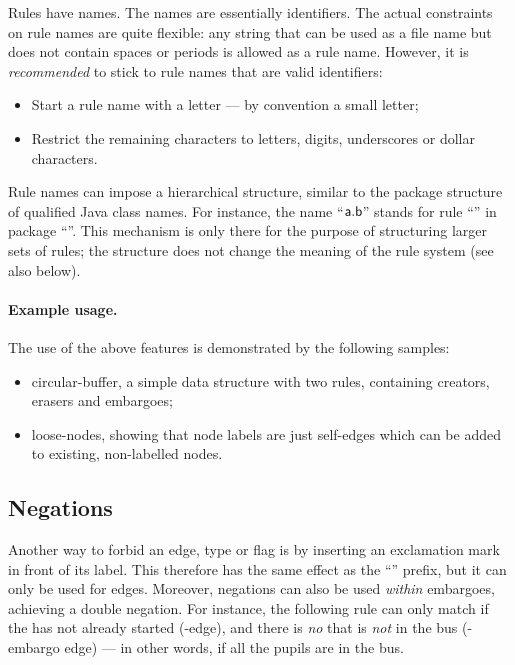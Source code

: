 Rules have names. The names are essentially identifiers. The actual constraints
on rule names are quite flexible: any string that can be used as a file name
but does not contain spaces or periods is allowed as a rule name. However, it
is \emph{recommended} to stick to rule names that are valid identifiers:
%
\begin{itemize}\noitemsep
\item Start a rule name with a letter --- by convention a small letter;
\item Restrict the remaining characters to letters, digits, underscores or
  dollar characters.
\end{itemize}
%
Rule names can impose a hierarchical structure, similar to the package
structure of qualified Java class names. For instance, the name
``$\textsf{a.b}$'' stands for rule ``'' in package
``''. This mechanism is only there for the purpose of structuring
larger sets of rules; the structure does not change the meaning of the rule
system (see also  below).

\paragraph{Example usage.}

The use of the above features is demonstrated by the following \Groove samples:
%
\begin{itemize}\noitemsep
\item \textsf{circular-buffer}, a simple data structure with two rules,
  containing creators, erasers and embargoes;
\item \textsf{loose-nodes}, showing that node labels are just self-edges which
  can be added to existing, non-labelled nodes.
\end{itemize}

\subsection{Negations}

Another way to forbid an edge, type or flag is by inserting an exclamation mark
in front of its label. This therefore has the same effect as the ``\notP''
prefix, but it can only be used for edges. Moreover, negations can also be used
\emph{within} embargoes, achieving a double negation. For instance, the
following rule can only match if the  has not already started
(-edge), and there is \emph{no}  that is
\emph{not} in the bus (-embargo edge) --- in other words, if all the
pupils are in the bus.

